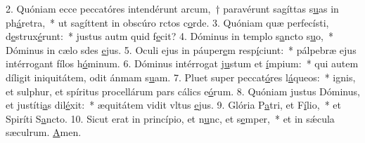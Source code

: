 2. Quóniam ecce peccatóres intendérunt arcum,~† paravérunt sagíttas s\uline{u}as in ph\uline{á}retra,~* ut sagíttent in obscúro rctos c\uline{o}rde.
3. Quóniam quæ perfecísti, d\uline{e}strux\uline{é}runt:~* justus autm quid f\uline{e}cit?
4. Dóminus in templo s\uline{a}ncto s\uline{u}o,~* Dóminus in cælo sdes \uline{e}jus.
5. Oculi ejus in páuper\uline{e}m resp\uline{í}ciunt:~* pálpebræ ejus intérrogant fílos h\uline{ó}minum.
6. Dóminus intérrogat j\uline{u}stum et \uline{í}mpium:~* qui autem díligit iniquitátem, odit ánmam s\uline{u}am.
7. Pluet super peccat\uline{ó}res l\uline{á}queos:~* ignis, et sulphur, et spíritus procellárum pars cálics e\uline{ó}rum.
8. Quóniam justus Dóminus, et justíti\uline{a}s dil\uline{é}xit:~* æquitátem vidit vltus \uline{e}jus.
9. Glória P\uline{a}tri, et F\uline{í}lio,~* et Spiríti S\uline{a}ncto.
10. Sicut erat in princípio, et n\uline{u}nc, et s\uline{e}mper,~* et in sǽcula sæculrum. \uline{A}men.
